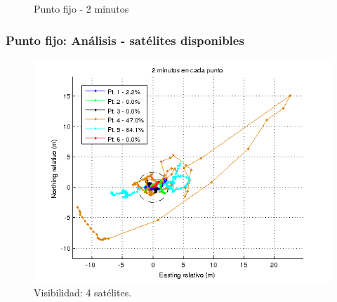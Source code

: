 \documentclass[main]{subfiles}
\begin{document}
\begin{figure}[h!]
\caption{Punto fijo - 2 minutos}
\label{fig:punto_fijo_dos_minutos}
\vspace{-50pt}
\end{figure}

\newpage
\subsubsection{Punto fijo: Análisis - \textbf{satélites disponibles}}
\label{sec:gps2-punto-fijo-analisis-sat-count}

\begin{figure}
  \includegraphics[width=.55\textwidth]{./pics_gps/or2_todos_sat_mal.png}
  \caption{Visibilidad: 4 satélites.}
  \label{fig:or2_todos_sat_mal.png}
\vspace{20pt}
\end{figure}
\end{document}
